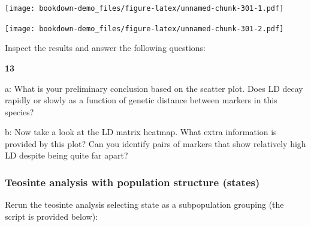 \documentclass[
]{book}
\makeatletter
\newenvironment{Shaded}{\begin{snugshade}}{\end{snugshade}}
\newcommand{\AttributeTok}[1]{\textcolor[rgb]{0.77,0.63,0.00}{#1}}
\newcommand{\DecValTok}[1]{\textcolor[rgb]{0.00,0.00,0.81}{#1}}
\newcommand{\FloatTok}[1]{\textcolor[rgb]{0.00,0.00,0.81}{#1}}
\newcommand{\FunctionTok}[1]{\textcolor[rgb]{0.00,0.00,0.00}{#1}}
\newcommand{\NormalTok}[1]{#1}
\newcommand{\OtherTok}[1]{\textcolor[rgb]{0.56,0.35,0.01}{#1}}
\newcommand{\SpecialCharTok}[1]{\textcolor[rgb]{0.00,0.00,0.00}{#1}}
\newcommand{\StringTok}[1]{\textcolor[rgb]{0.31,0.60,0.02}{#1}}
\newenvironment{kframe}{%
\medskip{}
\setlength{\fboxsep}{.8em}
 \def\at@end@of@kframe{}%
 \ifinner\ifhmode%
  \def\at@end@of@kframe{\end{minipage}}%
  \begin{minipage}{\columnwidth}%
 \fi\fi%
 \def\FrameCommand##1{\hskip\@totalleftmargin \hskip-\fboxsep
 \colorbox{shadecolor}{##1}\hskip-\fboxsep
     \hskip-\linewidth \hskip-\@totalleftmargin \hskip\columnwidth}%
 \MakeFramed {\advance\hsize-\width
   \@totalleftmargin\z@ \linewidth\hsize
   \@setminipage}}%
 {\par\unskip\endMakeFramed%
 \at@end@of@kframe}
\newenvironment{rmdblock}[1]
  {
  \begin{itemize}
  \renewcommand{\labelitemi}{
    \raisebox{-.7\height}[0pt][0pt]{
      {\setkeys{Gin}{width=3em,keepaspectratio}\texttt{[image: images/\#1]}}
    }
  }
  \setlength{\fboxsep}{1em}
  \begin{kframe}
  \item
  }
  {
  \end{kframe}
  \end{itemize}
  }
\newenvironment{rmdquiz}
  {\begin{rmdblock}{quiz}}
  {\end{rmdblock}}
\makeatother
\begin{document}
\texttt{[image: bookdown-demo\_files/figure-latex/unnamed-chunk-301-1.pdf]}

\begin{Shaded}
\end{Shaded}

\texttt{[image: bookdown-demo\_files/figure-latex/unnamed-chunk-301-2.pdf]}

Inspect the results and answer the following questions:

\begin{rmdquiz}
\textbf{13}

a: What is your preliminary conclusion based on the scatter plot. Does LD decay rapidly or slowly as a function of genetic distance between markers in this species?

b: Now take a look at the LD matrix heatmap. What extra information is provided by this plot? Can you identify pairs of markers that show relatively high LD despite being quite far apart?
\end{rmdquiz}

\hypertarget{teosinte-analysis-with-population-structure-states}{%
\subsubsection{Teosinte analysis with population structure (states)}\label{teosinte-analysis-with-population-structure-states}}

Rerun the teosinte analysis selecting state as a subpopulation grouping (the script is provided below):
\end{document}
